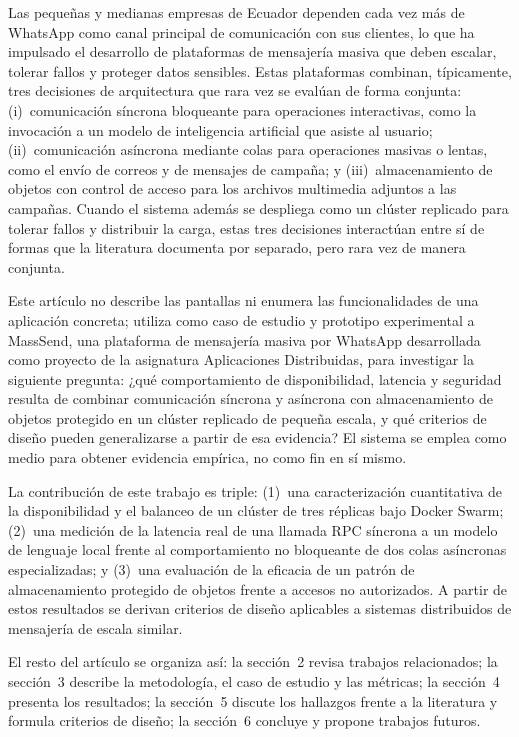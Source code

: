 Las pequeñas y medianas empresas de Ecuador dependen cada vez más de WhatsApp
como canal principal de comunicación con sus clientes, lo que ha impulsado el
desarrollo de plataformas de mensajería masiva que deben escalar, tolerar
fallos y proteger datos sensibles. Estas plataformas combinan, típicamente,
tres decisiones de arquitectura que rara vez se evalúan de forma conjunta:
(i)~comunicación síncrona bloqueante para operaciones interactivas, como la
invocación a un modelo de inteligencia artificial que asiste al usuario;
(ii)~comunicación asíncrona mediante colas para operaciones masivas o lentas,
como el envío de correos y de mensajes de campaña; y (iii)~almacenamiento de
objetos con control de acceso para los archivos multimedia adjuntos a las
campañas. Cuando el sistema además se despliega como un clúster replicado
para tolerar fallos y distribuir la carga, estas tres decisiones interactúan
entre sí de formas que la literatura documenta por separado, pero rara vez de
manera conjunta.

Este artículo no describe las pantallas ni enumera las funcionalidades de una
aplicación concreta; utiliza como caso de estudio y prototipo experimental a
MassSend, una plataforma de mensajería masiva por WhatsApp desarrollada como
proyecto de la asignatura Aplicaciones Distribuidas, para investigar la
siguiente pregunta: ¿qué comportamiento de disponibilidad, latencia y
seguridad resulta de combinar comunicación síncrona y asíncrona con
almacenamiento de objetos protegido en un clúster replicado de pequeña
escala, y qué criterios de diseño pueden generalizarse a partir de esa
evidencia? El sistema se emplea como medio para obtener evidencia empírica,
no como fin en sí mismo.

La contribución de este trabajo es triple: (1)~una caracterización
cuantitativa de la disponibilidad y el balanceo de un clúster de tres
réplicas bajo Docker Swarm; (2)~una medición de la latencia real de una
llamada RPC síncrona a un modelo de lenguaje local frente al comportamiento
no bloqueante de dos colas asíncronas especializadas; y (3)~una evaluación de
la eficacia de un patrón de almacenamiento protegido de objetos frente a
accesos no autorizados. A partir de estos resultados se derivan criterios de
diseño aplicables a sistemas distribuidos de mensajería de escala similar.

El resto del artículo se organiza así: la sección~2 revisa trabajos
relacionados; la sección~3 describe la metodología, el caso de estudio y las
métricas; la sección~4 presenta los resultados; la sección~5 discute los
hallazgos frente a la literatura y formula criterios de diseño; la sección~6
concluye y propone trabajos futuros.

